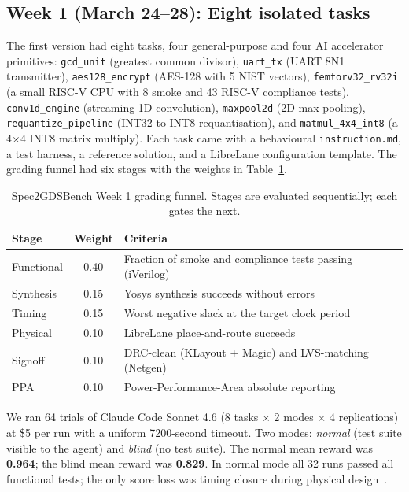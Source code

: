 \documentclass{article}
\begin{document}
\subsection{Week 1 (March 24--28): Eight isolated tasks}

The first version had eight tasks, four general-purpose and four AI accelerator
primitives:
\texttt{gcd\_unit} (greatest common divisor),
\texttt{uart\_tx} (UART 8N1 transmitter),
\texttt{aes128\_encrypt} (AES-128 with 5 NIST vectors),
\texttt{femtorv32\_rv32i} (a small RISC-V CPU with 8 smoke and 43 RISC-V compliance tests),
\texttt{conv1d\_engine} (streaming 1D convolution),
\texttt{maxpool2d} (2D max pooling),
\texttt{requantize\_pipeline} (INT32 to INT8 requantisation),
and \texttt{matmul\_4x4\_int8} (a 4$\times$4 INT8 matrix multiply). Each task came with
a behavioural \texttt{instruction.md}, a test harness, a reference solution, and a
LibreLane configuration template. The grading funnel had six stages with the weights in
Table~\ref{tab:spec2gds-stages}.

\begin{table}[H]
\centering
\caption{Spec2GDSBench Week 1 grading funnel. Stages are evaluated sequentially;
each gates the next.}
\label{tab:spec2gds-stages}
\footnotesize
\begin{tabular}{lcl}
\toprule
Stage & Weight & Criteria \\
\midrule
Functional        & 0.40 & Fraction of smoke and compliance tests passing (iVerilog) \\
Synthesis         & 0.15 & Yosys synthesis succeeds without errors \\
Timing            & 0.15 & Worst negative slack at the target clock period \\
Physical          & 0.10 & LibreLane place-and-route succeeds \\
Signoff           & 0.10 & DRC-clean (KLayout + Magic) and LVS-matching (Netgen) \\
PPA               & 0.10 & Power-Performance-Area absolute reporting \\
\bottomrule
\end{tabular}
\end{table}

We ran 64 trials of Claude Code Sonnet 4.6 (8 tasks $\times$ 2 modes $\times$ 4
replications) at \$5 per run with a uniform 7200-second timeout. Two modes: \emph{normal}
(test suite visible to the agent) and \emph{blind} (no test suite). The normal mean
reward was \textbf{0.964}; the blind mean reward was \textbf{0.829}. In normal mode all 32
runs passed all functional tests; the only score loss was timing closure during physical
design~\citep{spec2gdsbench-w1}.
\end{document}
